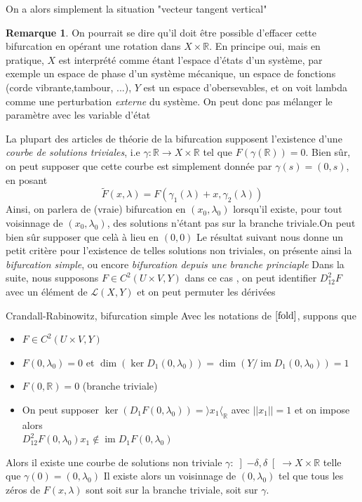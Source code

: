 \documentclass[a4paper,12pt,oneside,titlepage]{article}
\renewcommand{\tilde}[1]{\widetilde{#1}}
\newcommand{\R}[0]{\mathbb{R}}
\newcommand{\im}[0]{\operatorname{im}}
\theoremstyle{definition}
\newtheorem{remarque}[definition]{Remarque}
\theoremstyle{plain}
\begin{document}
On a alors simplement la situation "vecteur tangent vertical"
\begin{remarque}
    On pourrait se dire qu'il doit être possible d'effacer cette bifurcation en opérant une rotation dans $X\times \R$. En principe oui, mais en pratique, $X$ est interprété comme étant l'espace d'états d'un système, par exemple un espace de phase d'un système mécanique, un espace de fonctions (corde vibrante,tambour, ...), $Y$ est un espace d'obersevables, et on voit lambda comme une perturbation \textit{externe } du système. On peut donc pas mélanger le paramètre avec les variable d'état
\end{remarque}
La plupart des articles de théorie de la bifurcation supposent l'existence d'une \textit{courbe de solutions triviales}, i.e $\gamma: \R\rightarrow X\times \R$ tel que $F(\gamma(\R))={0}$. Bien sûr, on peut supposer que cette courbe est simplement  donnée par $\gamma(s)=(0,s)$, en posant 
\begin{equation*}
\tilde{F}(x,\lambda)=F(\gamma_1(\lambda)+x,\gamma_2(\lambda))
\end{equation*}
Ainsi, on parlera de (vraie) bifurcation  en $(x_0,\lambda_0)$ lorsqu'il existe, pour tout voisinnage de $(x_0,\lambda_0)$, des solutions n'étant pas sur la branche triviale.On peut bien sûr supposer que celà à lieu en $(0,0)$
Le résultat suivant nous donne un petit critère pour l'existence de telles solutions non triviales, on présente ainsi la \textit{bifurcation simple}, ou encore \textit{bifurcation depuis une branche princiaple}
Dans la suite, nous supposons $F\in C^2(U\times V,Y)$ 
dans ce cas , on peut identifier $D^2_{12} F$ avec un élément de $\mathcal{L}(X,Y)$ et on peut permuter les dérivées 
\begin{theobox}{Crandall-Rabinowitz, bifurcation simple}{} 
    Avec les notations de $\ref{fold}$, suppons que 
    \begin{itemize}
        \item $F\in C^2(U\times V,Y)$
        \item $F(0,\lambda_0)=0$ et $\dim (\ker D_1(0,\lambda_0))=\dim (Y/ \im D_1(0,\lambda_0))=1$
        \item $F(0,\R)={0}$ (branche triviale)
        \item On peut supposer  $\ker(D_1 F(0,\lambda_0))=\rangle x_1 \langle_{\R} $ 
        avec $||x_1||=1$ et on impose alors \\ $D^2_{12} F(0,\lambda_0)x_1\notin \im D_1 F
        (0,\lambda_0)$
    \end{itemize}
    Alors il existe une courbe de solutions non triviale 
         $\gamma :\left] -\delta,\delta\right[ \rightarrow X\times\R $ telle que $\gamma(0)=(0,\lambda_0)$
    Il existe alors un voisinnage  de $(0,\lambda_0)$ tel que tous les zéros de $F(x,\lambda)$ sont  soit sur la branche triviale, soit sur $\gamma$. 
\end{theobox}
\end{document}
